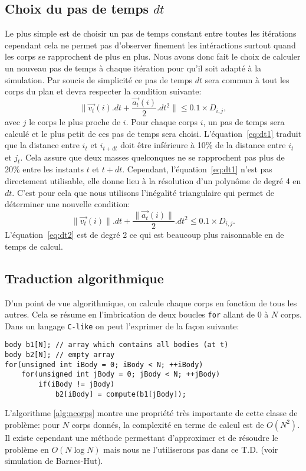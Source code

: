 \subsection{Choix du pas de temps $dt$}
Le plus simple est de choisir un pas de temps constant entre toutes les itérations cependant cela ne permet pas d'observer finement les intéractions surtout quand les corps se rapprochent de plus en plus.
Nous avons donc fait le choix de calculer un nouveau pas de temps à chaque itération pour qu'il soit adapté à la simulation.
Par soucis de simplicité ce pas de temps $dt$ sera commun à tout les corps du plan et devra respecter la condition suivante:
\begin{equation}
\label{eq:dt1}
	\|\vec{v_t}(i).dt + \frac{\vec{a_t}(i)}{2}.dt^2 \| \leq 0.1\times D_{i,j},
\end{equation}
avec $j$ le corps le plus proche de $i$.
Pour chaque corps $i$, un pas de temps sera calculé et le plus petit de ces pas de temps sera choisi.
L'équation~\ref{eq:dt1} traduit que la distance entre $i_t$ et $i_{t+dt}$ doit être inférieure à 10\% de la distance entre $i_t$ et $j_t$.
Cela assure que deux masses quelconques ne se rapprochent pas plus de 20\% entre les instants $t$ et $t + dt$.
Cependant, l'équation~\ref{eq:dt1} n'est pas directement utilisable, elle donne lieu à la résolution d'un polynôme de degré 4 en $dt$.
C'est pour cela que nous utilisons l'inégalité triangulaire qui permet de déterminer une nouvelle condition:
\begin{equation}
\label{eq:dt2}
	\|\vec{v_t}(i)\|.dt + \frac{\|\vec{a_t}(i)\|}{2}.dt^2  \leq 0.1\times D_{i,j}.
\end{equation}
L'équation~\ref{eq:dt2} est de degré 2 ce qui est beaucoup plus raisonnable en de temps de calcul.

\subsection{Traduction algorithmique}
D'un point de vue algorithmique, on calcule chaque corps en fonction de tous les autres.
Cela se résume en l'imbrication de deux boucles \texttt{for} allant de $0$ à $N$ corps.
Dans un langage \texttt{C-like} on peut l'exprimer de la façon suivante:
\begin{lstlisting}[caption={Pseudo code illustrant un algorithme de type $N$ corps},label={alg:ncorps}]
body b1[N]; // array which contains all bodies (at t)
body b2[N]; // empty array
for(unsigned int iBody = 0; iBody < N; ++iBody)
	for(unsigned int jBody = 0; jBody < N; ++jBody)
		if(iBody != jBody)
			b2[iBody] = compute(b1[jBody]);
\end{lstlisting}
L'algorithme \ref{alg:ncorps} montre une propriété très importante de cette classe de problème: pour $N$ corps donnés, la complexité en terme de calcul est de $O(N^2)$. 
Il existe cependant une méthode permettant d'approximer et de résoudre le problème en $O(N \log{N} )$ mais nous ne l'utiliserons pas dans ce T.D. (voir simulation de {\sc Barnes-Hut}).

